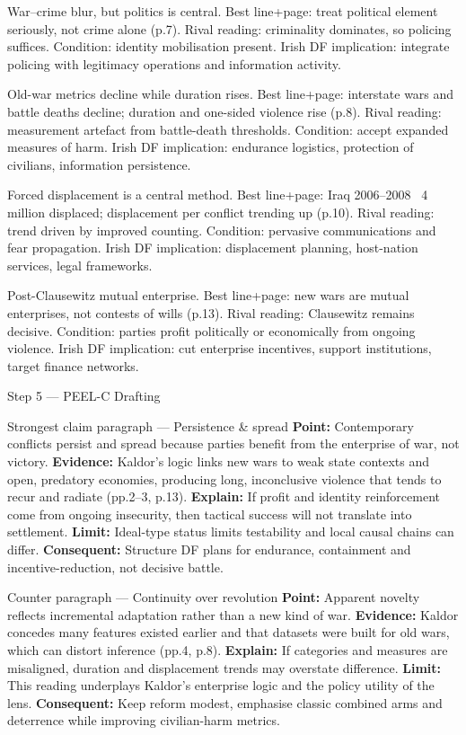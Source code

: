 War–crime blur, but politics is central.
Best line+page: treat political element seriously, not crime alone (p.7). Rival reading: criminality dominates, so policing suffices. Condition: identity mobilisation present. Irish DF implication: integrate policing with legitimacy operations and information activity.

Old-war metrics decline while duration rises.
Best line+page: interstate wars and battle deaths decline; duration and one-sided violence rise (p.8). Rival reading: measurement artefact from battle-death thresholds. Condition: accept expanded measures of harm. Irish DF implication: endurance logistics, protection of civilians, information persistence.

Forced displacement is a central method.
Best line+page: Iraq 2006–2008 ~4 million displaced; displacement per conflict trending up (p.10). Rival reading: trend driven by improved counting. Condition: pervasive communications and fear propagation. Irish DF implication: displacement planning, host-nation services, legal frameworks.

Post-Clausewitz mutual enterprise.
Best line+page: new wars are mutual enterprises, not contests of wills (p.13). Rival reading: Clausewitz remains decisive. Condition: parties profit politically or economically from ongoing violence. Irish DF implication: cut enterprise incentives, support institutions, target finance networks.

Step 5 — PEEL-C Drafting

Strongest claim paragraph — Persistence \& spread
\textbf{Point:} Contemporary conflicts persist and spread because parties benefit from the enterprise of war, not victory. \textbf{Evidence:} Kaldor’s logic links new wars to weak state contexts and open, predatory economies, producing long, inconclusive violence that tends to recur and radiate (pp.2–3, p.13). \textbf{Explain:} If profit and identity reinforcement come from ongoing insecurity, then tactical success will not translate into settlement. \textbf{Limit:} Ideal-type status limits testability and local causal chains can differ. \textbf{Consequent:} Structure DF plans for endurance, containment and incentive-reduction, not decisive battle.

Counter paragraph — Continuity over revolution
\textbf{Point:} Apparent novelty reflects incremental adaptation rather than a new kind of war. \textbf{Evidence:} Kaldor concedes many features existed earlier and that datasets were built for old wars, which can distort inference (pp.4, p.8). \textbf{Explain:} If categories and measures are misaligned, duration and displacement trends may overstate difference. \textbf{Limit:} This reading underplays Kaldor’s enterprise logic and the policy utility of the lens. \textbf{Consequent:} Keep reform modest, emphasise classic combined arms and deterrence while improving civilian-harm metrics.

